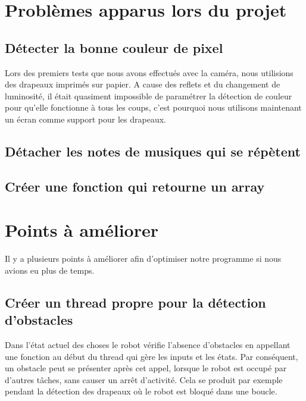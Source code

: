 \documentclass{article}
\begin{document}
    \section{Problèmes apparus lors du projet}
    
    \label{problème_couleurs}
    \subsection{Détecter la bonne couleur de pixel}
    Lors des premiers tests que nous avons effectués avec la caméra, nous utilisions des drapeaux imprimés sur papier. 
    A cause des reflets et du changement de luminosité, il était quasiment impossible de paramétrer la détection de couleur pour qu'elle fonctionne à tous les coups, c'est pourquoi nous utilisons maintenant un écran comme support pour les drapeaux.
    
    \subsection{Détacher les notes de musiques qui se répètent}
    
    \subsection{Créer une fonction qui retourne un array}
    
    \section{Points à améliorer}
    Il y a plusieurs points à améliorer afin d'optimiser notre programme si nous avions eu plus de temps.

    \subsection{Créer un thread propre pour la détection d'obstacles}
    Dans l'état actuel des choses le robot vérifie l'absence d'obstacles en appellant une fonction au début du thread qui gère les inputs et les états.
    Par conséquent, un obstacle peut se présenter après cet appel, lorsque le robot est occupé par d'autres tâches, sans causer un arrêt d'activité.
    Cela se produit par exemple pendant la détection des drapeaux où le robot est bloqué dans une boucle.
\end{document}
